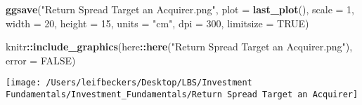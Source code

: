 \documentclass[
]{article}
\newenvironment{Shaded}{\begin{snugshade}}{\end{snugshade}}
\newcommand{\DataTypeTok}[1]{\textcolor[rgb]{0.13,0.29,0.53}{#1}}
\newcommand{\DecValTok}[1]{\textcolor[rgb]{0.00,0.00,0.81}{#1}}
\newcommand{\KeywordTok}[1]{\textcolor[rgb]{0.13,0.29,0.53}{\textbf{#1}}}
\newcommand{\NormalTok}[1]{#1}
\newcommand{\OperatorTok}[1]{\textcolor[rgb]{0.81,0.36,0.00}{\textbf{#1}}}
\newcommand{\OtherTok}[1]{\textcolor[rgb]{0.56,0.35,0.01}{#1}}
\newcommand{\StringTok}[1]{\textcolor[rgb]{0.31,0.60,0.02}{#1}}
\begin{document}
\begin{Shaded}
\begin{Highlighting}[]
\KeywordTok{ggsave}\NormalTok{(}\StringTok{"Return Spread Target an Acquirer.png"}\NormalTok{,}
       \DataTypeTok{plot =} \KeywordTok{last\_plot}\NormalTok{(),}
       \DataTypeTok{scale =} \DecValTok{1}\NormalTok{,}
       \DataTypeTok{width =} \DecValTok{20}\NormalTok{,}
       \DataTypeTok{height =} \DecValTok{15}\NormalTok{,}
       \DataTypeTok{units =} \StringTok{"cm"}\NormalTok{,}
       \DataTypeTok{dpi =} \DecValTok{300}\NormalTok{,}
       \DataTypeTok{limitsize =} \OtherTok{TRUE}\NormalTok{)}

\NormalTok{knitr}\OperatorTok{::}\KeywordTok{include\_graphics}\NormalTok{(here}\OperatorTok{::}\KeywordTok{here}\NormalTok{(}\StringTok{"Return Spread Target an Acquirer.png"}\NormalTok{), }\DataTypeTok{error =} \OtherTok{FALSE}\NormalTok{)}
\end{Highlighting}
\end{Shaded}

\begin{center}\texttt{[image: /Users/leifbeckers/Desktop/LBS/Investment Fundamentals/Investment\_Fundamentals/Return Spread Target an Acquirer]} \end{center}
\end{document}
